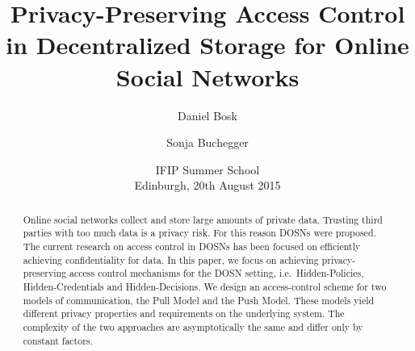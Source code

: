 \title{%
  Privacy-Preserving Access Control
  in Decentralized Storage
  for Online Social Networks
}
\author{%
  Daniel Bosk \and
  Sonja Buchegger
}
\date{IFIP Summer School\\Edinburgh, 20th August 2015}


\mode* %

\begin{abstract}
  Online social networks collect and store large amounts of private data.
  Trusting third parties with too much data is a privacy risk.
  For this reason \acp{DOSN} were proposed.
  The current research on access control in \acp{DOSN} has been focused on 
  efficiently achieving confidentiality for data.
  In this paper, we focus on achieving privacy-preserving access control 
  mechanisms for the \ac{DOSN} setting, i.e.~Hidden-Policies, 
  Hidden-Credentials and Hidden-Decisions.
  We design an access-control scheme for two models of communication, the Pull 
  Model and the Push Model.
  These models yield different privacy properties and requirements on the 
  underlying system.
  The complexity of the two approaches are asymptotically the same and differ 
  only by constant factors.

\end{abstract}


